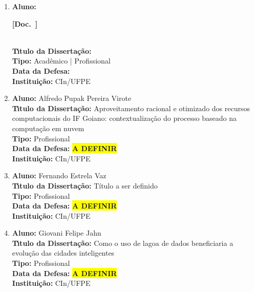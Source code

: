 \documentclass[a4paper,oneside,10pt]{article}
\newcounter{document}%
\newcommand\Doc{{\addtocounter{document}{1}\mbox{\sffamily\bfseries [Doc. \arabic{document}]}}}
\begin{document}
\begin{enumerate}
\renewcommand{\labelenumi}{{\large\bfseries\arabic{enumi}.}}

\item       \textbf{Aluno:} \Doc \\
            \textbf{T\'{\i}tulo da Disserta\c{c}\~{a}o:} \\
            \textbf{Tipo:} Acadêmico | Profissional\\
            \textbf{Data da Defesa:} \\
            \textbf{Institui\c{c}\~{a}o:} CIn/UFPE

\item       \textbf{Aluno:} Alfredo Pupak Pereira Virote \mbox{} \\
            \textbf{T\'{\i}tulo da Disserta\c{c}\~{a}o:} Aproveitamento racional e otimizado dos recursos computacionais do IF Goiano: contextualização do processo baseado na computação em nuvem\\
            \textbf{Tipo:} Profissional\\
            \textbf{Data da Defesa:} \colorbox{yellow}{\textbf{A DEFINIR}}\\
            \textbf{Institui\c{c}\~{a}o:} CIn/UFPE

\item       \textbf{Aluno:} Fernando Estrela Vaz \mbox{} \\
            \textbf{T\'{\i}tulo da Disserta\c{c}\~{a}o:} Título a ser definido\\
            \textbf{Tipo:} Profissional\\
            \textbf{Data da Defesa:} \colorbox{yellow}{\textbf{A DEFINIR}}\\
            \textbf{Institui\c{c}\~{a}o:} CIn/UFPE

\item       \textbf{Aluno:} Giovani Felipe Jahn \mbox{} \\
            \textbf{T\'{\i}tulo da Disserta\c{c}\~{a}o:} Como o uso de lagoa de dados beneficiaria a evolução das cidades inteligentes\\
            \textbf{Tipo:} Profissional\\
            \textbf{Data da Defesa:} \colorbox{yellow}{\textbf{A DEFINIR}}\\
            \textbf{Institui\c{c}\~{a}o:} CIn/UFPE


\end{enumerate}
\end{document}
